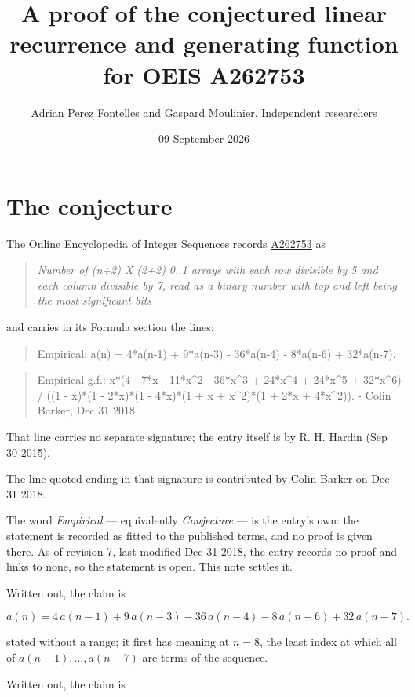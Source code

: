 \documentclass[11pt]{article}
\title{A proof of the conjectured linear recurrence and generating function for OEIS A262753}
\author{Adrian Perez Fontelles and Gaspard Moulinier, Independent researchers}
\date{09 September 2026}
\theoremstyle{definition}
\begin{document}
\maketitle
\section{The conjecture}

The Online Encyclopedia of Integer Sequences records \href{https://oeis.org/A262753}{A262753} as

\begin{quote}\itshape Number of (n+2) X (2+2) 0..1 arrays with each row divisible by 5 and each column divisible by 7, read as a binary number with top and left being the most significant bits\end{quote}

and carries in its Formula section the lines:

\begin{quote}\ttfamily Empirical: a(n) = 4*a(n-1) + 9*a(n-3) - 36*a(n-4) - 8*a(n-6) + 32*a(n-7).\end{quote}

\begin{quote}\ttfamily Empirical g.f.: x*(4 - 7*x - 11*x\textasciicircum{}2 - 36*x\textasciicircum{}3 + 24*x\textasciicircum{}4 + 24*x\textasciicircum{}5 + 32*x\textasciicircum{}6) / ((1 - x)*(1 - 2*x)*(1 - 4*x)*(1 + x + x\textasciicircum{}2)*(1 + 2*x + 4*x\textasciicircum{}2)). - Colin Barker, Dec 31 2018\end{quote}

That line carries no separate signature; the entry itself is by R. H. Hardin (Sep 30 2015).

The line quoted ending in that signature is contributed by Colin Barker on Dec 31 2018.

The word {\itshape Empirical} --- equivalently {\itshape Conjecture} --- is the entry's own: the statement is recorded as fitted to the published terms, and no proof is given there. As of revision 7, last modified Dec 31 2018, the entry records no proof and links to none, so the statement is open. This note settles it.

Written out, the claim is

\[a(n) = 4\,a(n-1) + 9\,a(n-3) - 36\,a(n-4) - 8\,a(n-6) + 32\,a(n-7).\]

stated without a range; it first has meaning at $n = 8$, the least index at which all of $a(n-1),\dots,a(n-7)$ are terms of the sequence.

Written out, the claim is
\end{document}
